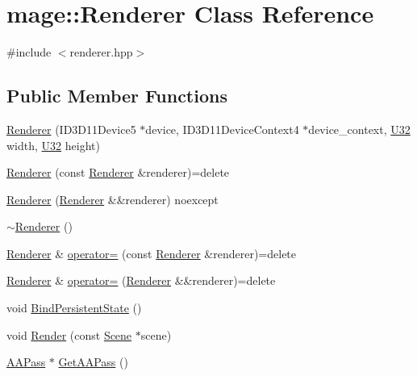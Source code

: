\hypertarget{classmage_1_1_renderer}{}\section{mage\+:\+:Renderer Class Reference}
\label{classmage_1_1_renderer}


{\ttfamily \#include $<$renderer.\+hpp$>$}

\subsection*{Public Member Functions}
\begin{DoxyCompactItemize}
\item 
\hyperlink{classmage_1_1_renderer_a4efd88a30f3ad43cf5d490d62259f921}{Renderer} (I\+D3\+D11\+Device5 $\ast$device, I\+D3\+D11\+Device\+Context4 $\ast$device\+\_\+context, \hyperlink{namespacemage_a41c104c036fba3756a74e19f793eeaa1}{U32} width, \hyperlink{namespacemage_a41c104c036fba3756a74e19f793eeaa1}{U32} height)
\item 
\hyperlink{classmage_1_1_renderer_acd6b509da2bd7e7d764b45b912fe5298}{Renderer} (const \hyperlink{classmage_1_1_renderer}{Renderer} \&renderer)=delete
\item 
\hyperlink{classmage_1_1_renderer_a50dcb6da913089a97475b2d1c0d0062e}{Renderer} (\hyperlink{classmage_1_1_renderer}{Renderer} \&\&renderer) noexcept
\item 
\hyperlink{classmage_1_1_renderer_a997e041f28cc71d069d1ab7d29fe6ced}{$\sim$\+Renderer} ()
\item 
\hyperlink{classmage_1_1_renderer}{Renderer} \& \hyperlink{classmage_1_1_renderer_a2762ead5f771ae95e4293cd7eb1a2834}{operator=} (const \hyperlink{classmage_1_1_renderer}{Renderer} \&renderer)=delete
\item 
\hyperlink{classmage_1_1_renderer}{Renderer} \& \hyperlink{classmage_1_1_renderer_aa381bb89bffdc8ea2d8e3625e28cd28a}{operator=} (\hyperlink{classmage_1_1_renderer}{Renderer} \&\&renderer)=delete
\item 
void \hyperlink{classmage_1_1_renderer_a0de9d7d913e5f92a75ff2cc075601b9d}{Bind\+Persistent\+State} ()
\item 
void \hyperlink{classmage_1_1_renderer_af18ff4c3d4a9c6d9ec9b30fdb5ad3455}{Render} (const \hyperlink{classmage_1_1_scene}{Scene} $\ast$scene)
\item 
\hyperlink{classmage_1_1_a_a_pass}{A\+A\+Pass} $\ast$ \hyperlink{classmage_1_1_renderer_a52fd71822fe54161ad505a0361ec6c75}{Get\+A\+A\+Pass} ()

\end{DoxyCompactItemize}
